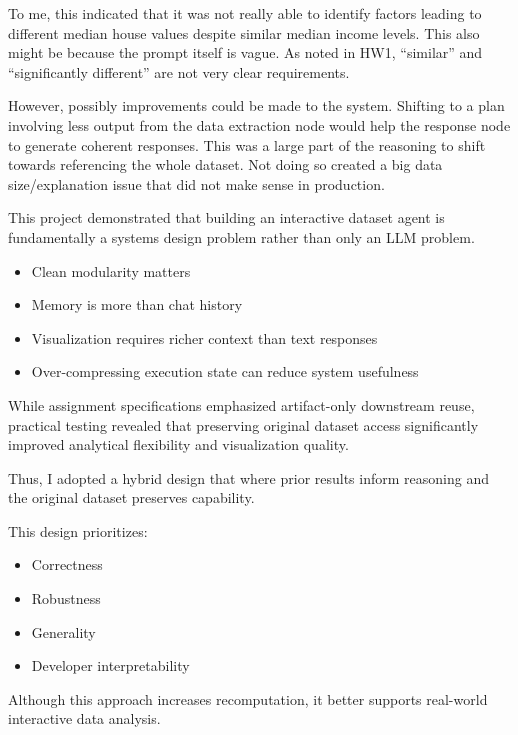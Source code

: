 \documentclass[12pt, oneside]{report}
\begin{document}
To me, this indicated that it was not really able to identify factors leading to different median house values despite similar median income levels. This also might be because the prompt itself is vague. As noted in HW1, ``similar'' and ``significantly different'' are not very clear requirements.

However, possibly improvements could be made to the system. Shifting to a plan involving less output from the data extraction node would help the response node to generate coherent responses. This was a large part of the reasoning to shift towards referencing the whole dataset. Not doing so created a big data size/explanation issue that did not make sense in production.




This project demonstrated that building an interactive dataset agent is fundamentally a systems design problem rather than only an LLM problem.


\begin{itemize}
    \item Clean modularity matters
    \item Memory is more than chat history
    \item Visualization requires richer context than text responses
    \item Over-compressing execution state can reduce system usefulness
\end{itemize}


While assignment specifications emphasized artifact-only downstream reuse, practical testing revealed that preserving original dataset access significantly improved analytical flexibility and visualization quality.

Thus, I adopted a hybrid design that where prior results inform reasoning and the original dataset preserves capability.


This design prioritizes:

\begin{itemize}
    \item Correctness
    \item Robustness
    \item Generality
    \item Developer interpretability
\end{itemize}

Although this approach increases recomputation, it better supports real-world interactive data analysis.
\end{document}
